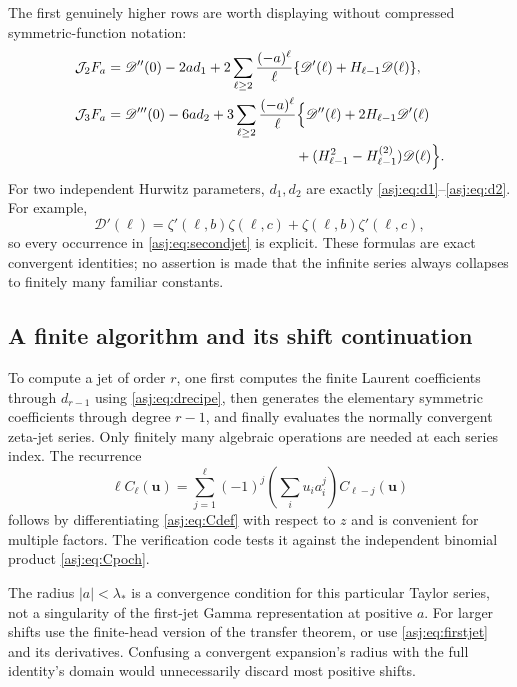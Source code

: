 \documentclass[11pt]{article}
\numberwithin{equation}{section}
\theoremstyle{definition}\newtheorem{definition}[theorem]{Definition}
\theoremstyle{remark}\newtheorem{remark}[theorem]{Remark}\newtheorem{example}[theorem]{Example}
\newcommand{\D}{\mathscr D}\newcommand{\calH}{\mathcal H}\newcommand{\calR}{\mathcal R}
\newcommand{\calJ}{\mathcal J}\newcommand{\calZ}{\mathcal Z}
\begin{document}
The first genuinely higher rows are worth displaying without compressed
symmetric-function notation:
\begin{align}\label{asj:eq:secondjet}
 \calJ_2F_a={}&\D''(0)-2a d_1
     +2\sum_{\ell\ge2}\frac{(-a)^\ell}{\ell}
           \{\D'(\ell)+H_{\ell-1}\D(\ell)\},\\
 \calJ_3F_a={}&\D'''(0)-6a d_2
     +3\sum_{\ell\ge2}\frac{(-a)^\ell}{\ell}
        \Big\{\D''(\ell)+2H_{\ell-1}\D'(\ell)\notag\\
        &\hspace{43mm}
        +(H_{\ell-1}^2-H_{\ell-1}^{(2)})\D(\ell)\Big\}.
 \label{asj:eq:thirdjet}
\end{align}
For two independent Hurwitz parameters, $d_1,d_2$ are exactly
\eqref{asj:eq:d1}--\eqref{asj:eq:d2}. For example,
\[
 \D'(\ell)=\zeta'(\ell,b)\zeta(\ell,c)
                    +\zeta(\ell,b)\zeta'(\ell,c),
\]
so every occurrence in \eqref{asj:eq:secondjet} is explicit. These formulas
are exact convergent identities; no assertion is made that the infinite
series always collapses to finitely many familiar constants.

\subsection{A finite algorithm and its shift continuation}
To compute a jet of order $r$, one first computes the finite Laurent
coefficients through $d_{r-1}$ using \eqref{asj:eq:drecipe}, then generates
the elementary symmetric coefficients through degree $r-1$, and finally
evaluates the normally convergent zeta-jet series. Only finitely many
algebraic operations are needed at each series index. The recurrence
\begin{equation}\label{asj:eq:Crecurrence}
 \ell C_\ell(\boldsymbol u)
     =\sum_{j=1}^{\ell}(-1)^j
         \left(\sum_i u_i a_i^j\right)C_{\ell-j}(\boldsymbol u)
\end{equation}
follows by differentiating \eqref{asj:eq:Cdef} with respect to $z$ and
is convenient for multiple factors. The verification code tests it
against the independent binomial product \eqref{asj:eq:Cpoch}.

The radius $|a|<\lambda_*$ is a convergence condition for this particular
Taylor series, not a singularity of the first-jet Gamma representation at
positive $a$. For larger shifts use the finite-head version of the transfer
theorem, or use \eqref{asj:eq:firstjet} and its derivatives. Confusing a
convergent expansion's radius with the full identity's domain would
unnecessarily discard most positive shifts.
\end{document}
